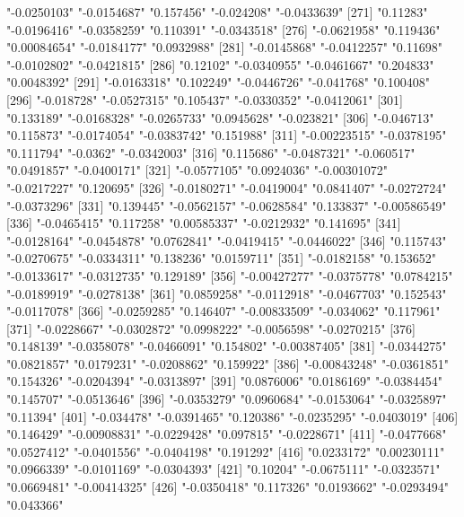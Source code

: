 \begin{Schunk}
\begin{Soutput}
[266] "-0.0250103"   "-0.0154687"   "0.157456"     "-0.024208"    "-0.0433639"  
[271] "0.11283"      "-0.0196416"   "-0.0358259"   "0.110391"     "-0.0343518"  
[276] "-0.0621958"   "0.119436"     "0.00084654"   "-0.0184177"   "0.0932988"   
[281] "-0.0145868"   "-0.0412257"   "0.11698"      "-0.0102802"   "-0.0421815"  
[286] "0.12102"      "-0.0340955"   "-0.0461667"   "0.204833"     "0.0048392"   
[291] "-0.0163318"   "0.102249"     "-0.0446726"   "-0.041768"    "0.100408"    
[296] "-0.018728"    "-0.0527315"   "0.105437"     "-0.0330352"   "-0.0412061"  
[301] "0.133189"     "-0.0168328"   "-0.0265733"   "0.0945628"    "-0.023821"   
[306] "-0.046713"    "0.115873"     "-0.0174054"   "-0.0383742"   "0.151988"    
[311] "-0.00223515"  "-0.0378195"   "0.111794"     "-0.0362"      "-0.0342003"  
[316] "0.115686"     "-0.0487321"   "-0.060517"    "0.0491857"    "-0.0400171"  
[321] "-0.0577105"   "0.0924036"    "-0.00301072"  "-0.0217227"   "0.120695"    
[326] "-0.0180271"   "-0.0419004"   "0.0841407"    "-0.0272724"   "-0.0373296"  
[331] "0.139445"     "-0.0562157"   "-0.0628584"   "0.133837"     "-0.00586549" 
[336] "-0.0465415"   "0.117258"     "0.00585337"   "-0.0212932"   "0.141695"    
[341] "-0.0128164"   "-0.0454878"   "0.0762841"    "-0.0419415"   "-0.0446022"  
[346] "0.115743"     "-0.0270675"   "-0.0334311"   "0.138236"     "0.0159711"   
[351] "-0.0182158"   "0.153652"     "-0.0133617"   "-0.0312735"   "0.129189"    
[356] "-0.00427277"  "-0.0375778"   "0.0784215"    "-0.0189919"   "-0.0278138"  
[361] "0.0859258"    "-0.0112918"   "-0.0467703"   "0.152543"     "-0.0117078"  
[366] "-0.0259285"   "0.146407"     "-0.00833509"  "-0.034062"    "0.117961"    
[371] "-0.0228667"   "-0.0302872"   "0.0998222"    "-0.0056598"   "-0.0270215"  
[376] "0.148139"     "-0.0358078"   "-0.0466091"   "0.154802"     "-0.00387405" 
[381] "-0.0344275"   "0.0821857"    "0.0179231"    "-0.0208862"   "0.159922"    
[386] "-0.00843248"  "-0.0361851"   "0.154326"     "-0.0204394"   "-0.0313897"  
[391] "0.0876006"    "0.0186169"    "-0.0384454"   "0.145707"     "-0.0513646"  
[396] "-0.0353279"   "0.0960684"    "-0.0153064"   "-0.0325897"   "0.11394"     
[401] "-0.034478"    "-0.0391465"   "0.120386"     "-0.0235295"   "-0.0403019"  
[406] "0.146429"     "-0.00908831"  "-0.0229428"   "0.097815"     "-0.0228671"  
[411] "-0.0477668"   "0.0527412"    "-0.0401556"   "-0.0404198"   "0.191292"    
[416] "0.0233172"    "0.00230111"   "0.0966339"    "-0.0101169"   "-0.0304393"  
[421] "0.10204"      "-0.0675111"   "-0.0323571"   "0.0669481"    "-0.00414325" 
[426] "-0.0350418"   "0.117326"     "0.0193662"    "-0.0293494"   "0.043366"    

\end{Soutput}
\end{Schunk}
